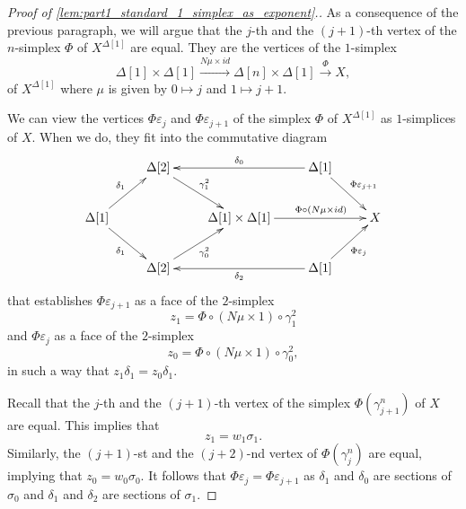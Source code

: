 \begin{proof}[Proof of \cref{lem:part1_standard_1_simplex_as_exponent}.]
As a consequence of the previous paragraph, we will argue that the $j$-th and the $(j+1)$-th vertex of the $n$-simplex $\Phi$ of $X^{\Delta [1]}$ are equal. They are the vertices of the $1$-simplex
\[\Delta [1]\times \Delta [1]\xrightarrow{N\mu \times id} \Delta [n]\times \Delta [1]\xrightarrow{\Phi } X,\]
of $X^{\Delta [1]}$ where $\mu$ is given by $0\mapsto j$ and $1\mapsto j+1$.

We can view the vertices $\Phi \varepsilon _j$ and $\Phi \varepsilon _{j+1}$ of the simplex $\Phi$ of $X^{\Delta [1]}$ as
$1$-simplices of $X$. When we do, they fit into the commutative diagram
\begin{displaymath}
 \xymatrix{
 & \Delta [2] \ar[dr]^{\gamma ^2_1} && \Delta [1] \ar[ll]_{\delta _0} \ar[dr]^{\Phi \varepsilon _{j+1}} \\
 \Delta [1] \ar[ur]^{\delta _1} \ar[dr]_{\delta _1} && \Delta [1]\times \Delta [1] \ar[rr]^(.6){\Phi \circ (N\mu \times id)} && X \\
 & \Delta [2] \ar[ur]_{\gamma ^2_0} && \Delta [1] \ar[ll]^{\delta _2} \ar[ur]_{\Phi \varepsilon _j}
 }
\end{displaymath}
that establishes $\Phi \varepsilon _{j+1}$ as a face of the $2$-simplex
\[z_1=\Phi \circ (N\mu \times 1)\circ \gamma ^2_1\]
and $\Phi \varepsilon _j$ as a face of the $2$-simplex
\[z_0=\Phi \circ (N\mu \times 1)\circ \gamma ^2_0,\]
in such a way that $z_1\delta _1=z_0\delta _1$.

Recall that the $j$-th and the $(j+1)$-th vertex of the simplex $\Phi (\gamma ^n_{j+1})$ of $X$ are equal. This implies that
\[z_1=w_1\sigma _1.\]
Similarly, the $(j+1)$-st and the $(j+2)$-nd vertex of $\Phi (\gamma ^n_j)$ are equal, implying that $z_0=w_0\sigma _0$. It follows that $\Phi \varepsilon _j=\Phi \varepsilon _{j+1}$ as $\delta _1$ and $\delta _0$ are sections of $\sigma _0$ and $\delta _1$ and $\delta _2$ are sections of $\sigma _1$.
\end{proof}


